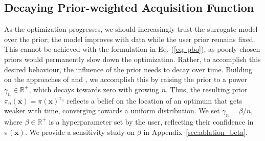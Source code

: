 \documentclass{article}
\newcommand{\frank}[1]{\todo[color=yellow]{Frank: #1}} %
\newcommand{\pri}[0]{{\pi}}
\begin{document}
\subsection{Decaying Prior-weighted Acquisition Function}\label{sec:dpw_acq} \label{dpaf}
As the optimization progresses, we should increasingly trust the surrogate model over the prior; 
the model improves with data while the user prior remains fixed.
This cannot be achieved with the formulation in Eq. (\ref{eq: pbo}), as poorly-chosen priors would permanently slow down the optimization.
Rather, to accomplish this desired behaviour, the influence of the prior needs to decay over time. 
Building on the approaches of \citet{lee2020costaware} and \citet{souza2021bayesian}, we accomplish this by raising the prior to a power $\gamma_n \in \mathbb{R}^+$, which decays towards zero with growing $n$. 
Thus, the resulting prior $\pri_n(\bm{x}) = \pri(\bm{x})^{\gamma_n}$ reflects a belief on the location of an optimum that gets weaker with time, converging towards a uniform distribution. We set $\gamma_n = \beta/n$, where $\beta \in \mathbb{R}^+$ is a hyperparameter set by the user, reflecting their confidence in $\pri(\bm{x})$. We provide a sensitivity study on $\beta$ in Appendix~\ref{sec:ablation_beta}. 
\end{document}
